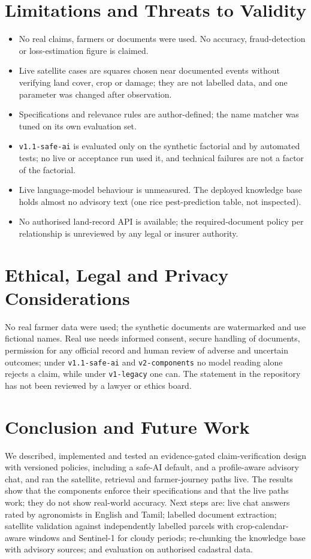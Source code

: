 \documentclass{ieeeaccess}
\begin{document}
\section{Limitations and Threats to Validity}
\begin{itemize}
\item No real claims, farmers or documents were used. No accuracy, fraud-detection or loss-estimation figure is claimed.
\item Live satellite cases are \SatLiveSquares{} squares chosen near documented events without verifying land cover, crop or damage; they are not labelled data, and one parameter was changed after observation.
\item Specifications and relevance rules are author-defined; the name matcher was tuned on its own evaluation set.
\item \texttt{v1.1-safe-ai} is evaluated only on the synthetic factorial and by automated tests; no live or acceptance run used it, and technical failures are not a factor of the factorial.
\item Live language-model behaviour is unmeasured. The deployed knowledge base holds almost no advisory text (one rice pest-prediction table, not inspected).
\item No authorised land-record API is available; the required-document policy per relationship is unreviewed by any legal or insurer authority.
\end{itemize}

\section{Ethical, Legal and Privacy Considerations}
No real farmer data were used; the synthetic documents are watermarked and use fictional names. Real use needs informed consent, secure handling of documents, permission for any official record and human review of adverse and uncertain outcomes; under \texttt{v1.1-safe-ai} and \texttt{v2-components} no model reading alone rejects a claim, while under \texttt{v1-legacy} one can. The statement in the repository has not been reviewed by a lawyer or ethics board.

\section{Conclusion and Future Work}
We described, implemented and tested an evidence-gated claim-verification design with versioned policies, including a safe-AI default, and a profile-aware advisory chat, and ran the satellite, retrieval and farmer-journey paths live. The results show that the components enforce their specifications and that the live paths work; they do not show real-world accuracy. Next steps are: live chat answers rated by agronomists in English and Tamil; labelled document extraction; satellite validation against independently labelled parcels with crop-calendar-aware windows and Sentinel-1 for cloudy periods; re-chunking the knowledge base with advisory sources; and evaluation on authorised cadastral data.
\end{document}
